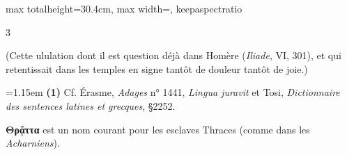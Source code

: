 \documentclass[11pt,twoside]{book}
\newcommand{\italique}[1]{\textit{#1}}
\newcommand{\latin}[1]{\textit{#1}}
\begin{document}
\begin{adjustbox}{max totalheight=30.4cm, max width=\textwidth, keepaspectratio}
\begin{minipage}{\textwidth}
{\begin{multicols}{3}
\par\vspace{1.5pt}
\noindent (Cette ululation dont il est question déjà dans Homère (\italique{Iliade}, VI, 301), et qui retentissait dans les temples en signe tantôt de douleur tantôt de joie.)
\par\vspace{1.5pt}
\par\vspace{1.2pt}\par\nopagebreak\vspace{1pt}\noindent\hangindent=1.15em {\color{sepiaNote}\textbf{(1)}} Cf. Érasme, \italique{Adages} n° 1441, \latin{Lingua juravit} et Tosi, \italique{Dictionnaire des sentences latines et grecques}, §2252.
\par\vspace{1.5pt}
 \textbf{Θρᾷττα} est un nom courant pour les esclaves Thraces (comme dans les \italique{Acharniens}).
\par\end{multicols}}
\end{minipage}\end{adjustbox}
\newpage
\end{document}
